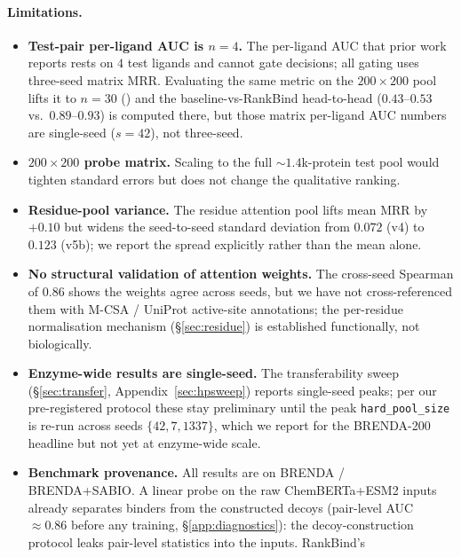 \documentclass[11pt,a4paper]{article}
\newcommand{\method}{RankBind\xspace}
\newcommand{\plauc}{per-ligand AUC}
\newcommand{\matmrr}{matrix MRR}
\begin{document}
\paragraph{Limitations.}
\begin{itemize}[leftmargin=*,itemsep=0pt,topsep=1pt]
  \item \textbf{Test-pair \plauc{} is $n=4$.} The \plauc{} that prior
        work reports rests on $4$ test ligands and cannot gate decisions;
        all gating uses three-seed \matmrr. Evaluating the same metric on
        the $200\times200$ pool lifts it to $n=30$ () and
        the baseline-vs-\method head-to-head ($0.43$--$0.53$ vs.\
        $0.89$--$0.93$) is computed there, but those matrix \plauc{}
        numbers are single-seed ($s=42$), not three-seed.
  \item \textbf{$200 \times 200$ probe matrix.} Scaling to the full
        $\sim 1.4$k-protein test pool would tighten standard errors but
        does not change the qualitative ranking.
  \item \textbf{Residue-pool variance.} The residue attention pool lifts
        mean MRR by $+0.10$ but widens the seed-to-seed standard
        deviation from $0.072$ (v4) to $0.123$ (v5b); we report the
        spread explicitly rather than the mean alone.
  \item \textbf{No structural validation of attention weights.} The
        cross-seed Spearman of $0.86$ shows the weights agree across
        seeds, but we have not cross-referenced them with M-CSA /
        UniProt active-site annotations; the per-residue normalisation
        mechanism (\S\ref{sec:residue}) is established functionally,
        not biologically.
  \item \textbf{Enzyme-wide results are single-seed.} The
        transferability sweep (\S\ref{sec:transfer},
        Appendix~\ref{sec:hpsweep}) reports single-seed peaks; per our
        pre-registered protocol these stay preliminary until the peak
        \texttt{hard\_pool\_size} is re-run across seeds
        $\{42, 7, 1337\}$, which we report for the BRENDA-200 headline
        but not yet at enzyme-wide scale.
  \item \textbf{Benchmark provenance.} All results are on
        BRENDA / BRENDA+SABIO. A linear probe on the raw
        ChemBERTa+ESM2 inputs already separates binders from the
        constructed decoys (pair-level AUC $\approx 0.86$ before any
        training, \S\ref{app:diagnostics}): the decoy-construction
        protocol leaks pair-level statistics into the inputs. \method's

\end{itemize}
\end{document}
